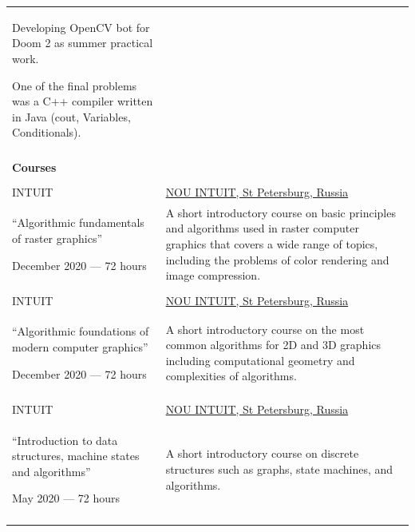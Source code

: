 \documentclass[12pt]{article}
\begin{document}
\begin{tabularx}{500pt}{eX}
        Developing OpenCV bot for Doom 2 as summer practical work.

        One of the final problems was a C++ compiler written in Java (cout, Variables, Conditionals).

        \\

        &\\

        \textbf{Courses} & \\

        &\\

        INTUIT & \underline{NOU INTUIT, St Petersburg, Russia} \\

        ``Algorithmic fundamentals of raster graphics''

        December 2020 --- 72 hours

        & A short introductory course on basic principles and algorithms used in raster computer graphics that covers a wide range of topics, including the problems of color rendering and image compression.\\

        &\\

        INTUIT & \underline{NOU INTUIT, St Petersburg, Russia} \\

        ``Algorithmic foundations of modern computer graphics''

        December 2020 --- 72 hours

        & A short introductory course on the most common algorithms for 2D and 3D graphics including computational geometry and complexities of algorithms.

        \\

        &\\

        INTUIT & \underline{NOU INTUIT, St Petersburg, Russia} \\

        ``Introduction to data structures, machine states and algorithms''

        May 2020 --- 72 hours

        & A short introductory course on discrete structures such as graphs, state machines, and algorithms.\\

        &\\


\end{tabularx}
\end{document}
